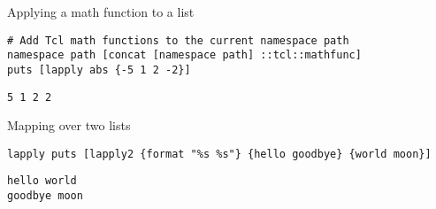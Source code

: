 \begin{example}{Applying a math function to a list}
\begin{lstlisting}
# Add Tcl math functions to the current namespace path
namespace path [concat [namespace path] ::tcl::mathfunc]
puts [lapply abs {-5 1 2 -2}]
\end{lstlisting}
\tcblower
\begin{lstlisting}
5 1 2 2
\end{lstlisting}
\end{example}

\begin{example}{Mapping over two lists}
\begin{lstlisting}
lapply puts [lapply2 {format "%s %s"} {hello goodbye} {world moon}]
\end{lstlisting}
\tcblower
\begin{lstlisting}
hello world
goodbye moon
\end{lstlisting}
\end{example}

\clearpage
